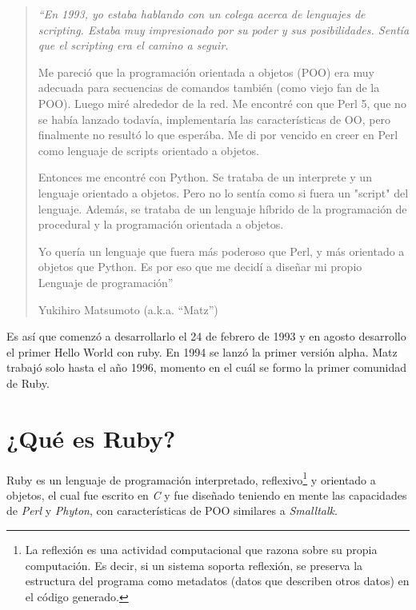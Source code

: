 \documentclass{article}
\begin{document}
\begin{quotation}
\em``En 1993, yo estaba hablando con un colega acerca de lenguajes de scripting. Estaba muy impresionado por su poder y sus posibilidades. Sentía que el scripting era el camino a seguir.
	\par
	Me pareció que la programación orientada a objetos (POO) era muy adecuada para secuencias de comandos también (como viejo fan de la POO). Luego miré alrededor de la red. Me encontré con que Perl 5, que no se había lanzado todavía, implementaría las características de OO, pero  finalmente no resultó lo que esperába. Me di por vencido en creer en Perl como lenguaje de scripts orientado a objetos.
	\par
	Entonces me encontré con Python. Se trataba de un interprete y un lenguaje orientado a objetos. Pero no lo sentía como si fuera un "script" del lenguaje. Además, se trataba de un lenguaje híbrido de la programación de procedural y la programación orientada a objetos.
	\par
	Yo quería un lenguaje que fuera más poderoso que Perl, y más orientado a objetos que Python. Es por eso que me decidí a diseñar mi propio Lenguaje de programación''
\begin{flushright} Yukihiro Matsumoto (a.k.a. “Matz”)\end{flushright}
\end{quotation}  

Es así que comenzó a desarrollarlo el 24 de febrero de 1993 y en agosto desarrollo el primer Hello World con ruby. En 1994 se lanzó la primer versión alpha. Matz trabajó solo hasta el año 1996, momento en el cuál se formo la primer comunidad de Ruby.




\section{¿Qué es Ruby?}

	Ruby es un lenguaje de programación interpretado, reflexivo\footnote{La reflexión es una actividad computacional que razona sobre su propia computación. Es decir, si un sistema soporta reflexión, se preserva la estructura del programa como metadatos (datos que describen otros datos) en el código generado.} y orientado a objetos, el cual fue escrito en \textit{C} y fue diseñado teniendo en mente las capacidades de \textit{Perl} y \textit{Phyton}, con características de POO similares a \textit{Smalltalk}.
\end{document}
